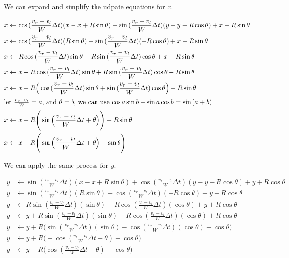 \documentclass{article}
\begin{document}
We can expand and simplify the udpate equations for $x$.

\begin{align}
  x &\leftarrow \cos{(\frac{v_r-v_l}{W}\Delta t)}(x-x+R\sin{\theta})-\sin{(\frac{v_r-v_l}{W}\Delta t)}(y-y-R\cos{\theta}) + x-R\sin{\theta} \\
  x &\leftarrow \cos{(\frac{v_r-v_l}{W}\Delta t)}(R\sin{\theta})-\sin{(\frac{v_r-v_l}{W}\Delta t)}(-R\cos{\theta}) + x-R\sin{\theta} \\
  x &\leftarrow R\cos{(\frac{v_r-v_l}{W}\Delta t)}\sin{\theta}+R\sin{(\frac{v_r-v_l}{W}\Delta t)}\cos{\theta} + x-R\sin{\theta} \\
  x &\leftarrow x+R\cos{(\frac{v_r-v_l}{W}\Delta t)}\sin{\theta}+R\sin{(\frac{v_r-v_l}{W}\Delta t)}\cos{\theta}-R\sin{\theta} \\
  x &\leftarrow x+R\Big(\cos{(\frac{v_r-v_l}{W}\Delta t)}\sin{\theta}+\sin{(\frac{v_r-v_l}{W}\Delta t)}\cos{\theta}\Big)-R\sin{\theta} \\
  \shortintertext{let $\frac{v_r-v_l}{W}=a$, and $\theta=b$, we can use $\cos{a}\sin{b}+\sin{a}\cos{b}=\sin{(a+b)}$}
  x &\leftarrow x+R\Bigg(\sin{\Big(\frac{v_r-v_l}{W}\Delta t+\theta}\Big)\Bigg)-R\sin{\theta} \\
  x &\leftarrow x+R\Bigg(\sin{\Big(\frac{v_r-v_l}{W}\Delta t+\theta}\Big)-\sin{\theta}\Bigg)
\end{align}

We can apply the same process for $y$.

\begin{align}
  y &\leftarrow \sin{(\frac{v_r-v_l}{W}\Delta t)}(x-x+R\sin{\theta})+\cos{(\frac{v_r-v_l}{W}\Delta t)}(y-y-R\cos{\theta}) + y+R\cos{\theta} \\
  y &\leftarrow \sin{(\frac{v_r-v_l}{W}\Delta t)}(R\sin{\theta})+\cos{(\frac{v_r-v_l}{W}\Delta t)}(-R\cos{\theta}) + y+R\cos{\theta} \\
  y &\leftarrow R\sin{(\frac{v_r-v_l}{W}\Delta t)}(\sin{\theta})-R\cos{(\frac{v_r-v_l}{W}\Delta t)}(\cos{\theta}) + y+R\cos{\theta} \\
  y &\leftarrow y + R\sin{(\frac{v_r-v_l}{W}\Delta t)}(\sin{\theta})-R\cos{(\frac{v_r-v_l}{W}\Delta t)}(\cos{\theta}) + R\cos{\theta} \\
  y &\leftarrow y + R\Bigg(\sin{(\frac{v_r-v_l}{W}\Delta t)}(\sin{\theta})-\cos{(\frac{v_r-v_l}{W}\Delta t)}(\cos{\theta}) + \cos{\theta}\Bigg) \\
  y &\leftarrow y + R\Bigg(-\cos{(\frac{v_r-v_l}{W}\Delta t + \theta)} + \cos{\theta}\Bigg) \\
  y &\leftarrow y - R\Bigg(\cos{(\frac{v_r-v_l}{W}\Delta t + \theta)} - \cos{\theta}\Bigg)
\end{align}
\end{document}
